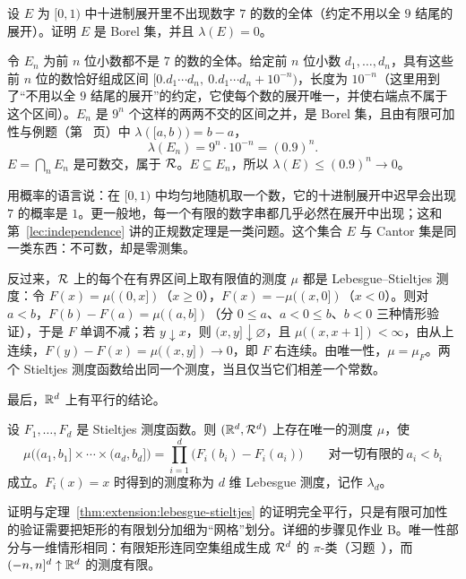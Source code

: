 \begin{workedexample}\label{we:extension:no-seven}
设 $E$ 为 $[0,1)$ 中十进制展开里不出现数字 $7$ 的数的全体（约定不用以全 $9$ 结尾的展开）。证明 $E$ 是 Borel 集，并且 $\lambda(E)=0$。
\end{workedexample}
\begin{solution}
令 $E_n$ 为前 $n$ 位小数都不是 $7$ 的数的全体。给定前 $n$ 位小数 $d_1,\dots,d_n$，具有这些前 $n$ 位的数恰好组成区间 $[0.d_1\cdots d_n,\ 0.d_1\cdots d_n+10^{-n})$，长度为 $10^{-n}$（这里用到了“不用以全 $9$ 结尾的展开”的约定，它使每个数的展开唯一，并使右端点不属于这个区间）。$E_n$ 是 $9^n$ 个这样的两两不交的区间之并，是 Borel 集，且由有限可加性与例题（第~\pageref{we:extension:atoms} 页）中 $\lambda([a,b))=b-a$，
\[
\lambda(E_n)=9^n\cdot10^{-n}=(0.9)^n .
\]
$E=\bigcap_nE_n$ 是可数交，属于 $\mathcal{R}$。$E\subseteq E_n$，所以 $\lambda(E)\leqslant(0.9)^n\to0$。

用概率的语言说：在 $[0,1)$ 中均匀地随机取一个数，它的十进制展开中迟早会出现 $7$ 的概率是 $1$。更一般地，每一个有限的数字串都几乎必然在展开中出现；这和第~\ref{lec:independence} 讲的正规数定理是一类问题。这个集合 $E$ 与 Cantor 集是同一类东西：不可数，却是零测集。
\end{solution}

反过来，$\mathcal{R}$ 上的每个在有界区间上取有限值的测度 $\mu$ 都是 Lebesgue--Stieltjes 测度：令 $F(x)=\mu((0,x])$（$x\geqslant0$），$F(x)=-\mu((x,0])$（$x<0$）。则对 $a<b$，$F(b)-F(a)=\mu((a,b])$（分 $0\leqslant a$、$a<0\leqslant b$、$b<0$ 三种情形验证），于是 $F$ 单调不减；若 $y\downarrow x$，则 $(x,y]\downarrow\varnothing$，且 $\mu((x,x+1])<\infty$，由从上连续，$F(y)-F(x)=\mu((x,y])\to0$，即 $F$ 右连续。由唯一性，$\mu=\mu_F$。两个 Stieltjes 测度函数给出同一个测度，当且仅当它们相差一个常数。

最后，$\mathbb{R}^d$ 上有平行的结论。

\begin{theorem}\label{thm:extension:Rd}
设 $F_1,\dots,F_d$ 是 Stieltjes 测度函数。则 $(\mathbb{R}^d,\mathcal{R}^d)$ 上存在唯一的测度 $\mu$，使
\[
\mu\bigl((a_1,b_1]\times\cdots\times(a_d,b_d]\bigr)=\prod_{i=1}^d\bigl(F_i(b_i)-F_i(a_i)\bigr)\qquad\text{对一切有限的}\ a_i<b_i
\]
成立。$F_i(x)=x$ 时得到的测度称为 $d$ 维 Lebesgue 测度，记作 $\lambda_d$。
\end{theorem}

证明与定理~\ref{thm:extension:lebesgue-stieltjes} 的证明完全平行，只是有限可加性的验证需要把矩形的有限划分加细为“网格”划分。详细的步骤见作业 B。唯一性部分与一维情形相同：有限矩形连同空集组成生成 $\mathcal{R}^d$ 的 $\pi$-类（习题~），而 $(-n,n]^d\uparrow\mathbb{R}^d$ 的测度有限。

